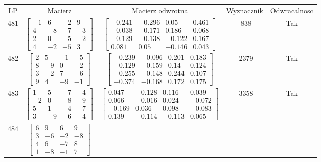 \documentclass[a4paper,12pt]{article}
\begin{document}
\bgroup {} \vspace{0.2in} \begin{tabular}{c c c c c}
LP & Macierz & Macierz odwrotna & Wyznacznik & Odwracalnosc\\
481
&
$\begin{bmatrix} -1 & 6 & -2 & 9 \\ 4 & -8 & -7 & -3 \\ 2 & 0 & -5 & -2 \\ 4 & -2 & -5 & 3 \end{bmatrix}$
&
$\begin{bmatrix} -0.241 & -0.296 & 0.05 & 0.461 \\ -0.038 & -0.171 & 0.186 & 0.068 \\ -0.129 & -0.138 & -0.122 & 0.167 \\ 0.081 & 0.05 & -0.146 & 0.043 \end{bmatrix}$
&
-838
&
Tak
\\
482
&
$\begin{bmatrix} 2 & 5 & -1 & -5 \\ 8 & -9 & 0 & -2 \\ 3 & -2 & 7 & -6 \\ 9 & 4 & -9 & -1 \end{bmatrix}$
&
$\begin{bmatrix} -0.239 & -0.096 & 0.201 & 0.183 \\ -0.129 & -0.159 & 0.14 & 0.124 \\ -0.255 & -0.148 & 0.244 & 0.107 \\ -0.374 & -0.168 & 0.172 & 0.175 \end{bmatrix}$
&
-2379
&
Tak
\\
483
&
$\begin{bmatrix} 1 & 5 & -7 & -4 \\ -2 & 0 & -8 & -9 \\ 5 & 1 & -4 & -7 \\ 3 & -9 & -6 & -4 \end{bmatrix}$
&
$\begin{bmatrix} 0.047 & -0.128 & 0.116 & 0.039 \\ 0.066 & -0.016 & 0.024 & -0.072 \\ -0.169 & 0.036 & 0.098 & -0.083 \\ 0.139 & -0.114 & -0.113 & 0.065 \end{bmatrix}$
&
-3358
&
Tak
\\
484
&
$\begin{bmatrix} 6 & 9 & 6 & 9 \\ 3 & -6 & -2 & -8 \\ 4 & 6 & -7 & 8 \\ 1 & -8 & -1 & 7 \end{bmatrix}$

\end{tabular}
\end{document}
